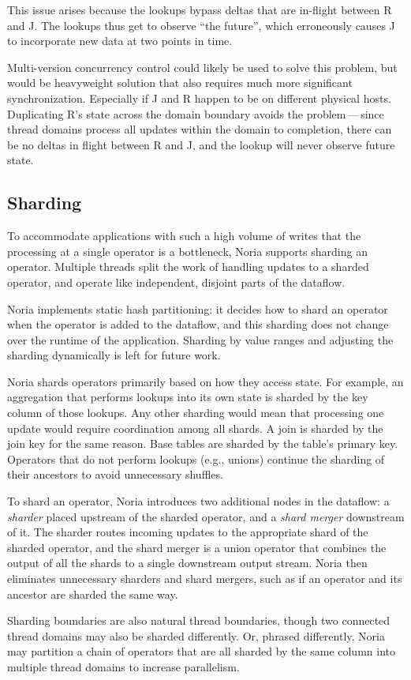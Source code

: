 This issue arises because the lookups bypass deltas that are in-flight between R
and J. The lookups thus get to observe ``the future'', which erroneously causes
J to incorporate new data at two points in time.

Multi-version concurrency control could likely be used to solve this problem,
but would be heavyweight solution that also requires much more significant
synchronization. Especially if J and R happen to be on different physical hosts.
Duplicating R's state across the domain boundary avoids the problem\,---\,since
thread domains process all updates within the domain to completion, there can be
no deltas in flight between R and J, and the lookup will never observe future
state.

\subsection{Sharding}
\label{s:noria:sharding}

To accommodate applications with such a high volume of writes that the
processing at a single operator is a bottleneck, Noria supports sharding an
operator. Multiple threads split the work of handling updates to a sharded
operator, and operate like independent, disjoint parts of the dataflow.

Noria implements static hash partitioning: it decides how to shard an operator
when the operator is added to the dataflow, and this sharding does not change
over the runtime of the application. Sharding by value ranges and adjusting the
sharding dynamically is left for future work.

Noria shards operators primarily based on how they access state. For example, an
aggregation that performs lookups into its own state is sharded by the key
column of those lookups. Any other sharding would mean that processing one
update would require coordination among all shards. A join is sharded by the
join key for the same reason. Base tables are sharded by the table's primary
key. Operators that do not perform lookups (e.g., unions) continue the sharding
of their ancestors to avoid unnecessary shuffles.

To shard an operator, Noria introduces two additional nodes in the dataflow: a
\emph{sharder} placed upstream of the sharded operator, and a \emph{shard
merger} downstream of it. The sharder routes incoming updates to the appropriate
shard of the sharded operator, and the shard merger is a union operator that
combines the output of all the shards to a single downstream output stream.
Noria then eliminates unnecessary sharders and shard mergers, such as if an
operator and its ancestor are sharded the same way.

Sharding boundaries are also natural thread boundaries, though two connected
thread domains may also be sharded differently. Or, phrased differently, Noria
may partition a chain of operators that are all sharded by the same column into
multiple thread domains to increase parallelism.

